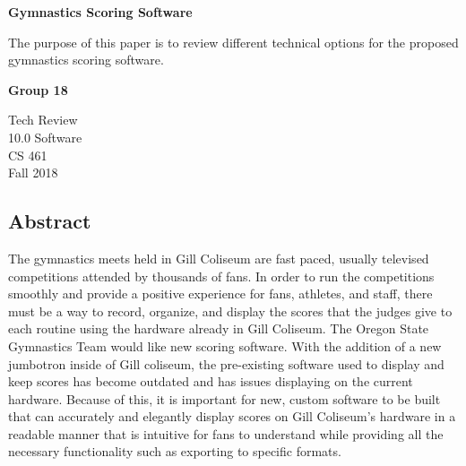 \documentclass[a4paper, 10pt, draftclsnofoot, onecolumn]{article}
\begin{document}
\begin{titlepage}
    \begin{center}
        \vspace*{1cm}
        
        \textbf{Gymnastics Scoring Software}
        
        \vspace{0.5cm}
        The purpose of this paper is to review different technical options for the proposed gymnastics scoring software.
        
        \vspace{1.5cm}
        
        \textbf{Group 18}
        
        Tech Review\\
        10.0 Software\\
        CS 461\\
        Fall 2018\\
        
    \end{center}
    
    \begin{center}
    \section*{Abstract}
    The gymnastics meets held in Gill Coliseum are fast paced, usually televised competitions attended by thousands of fans. In order to run the competitions smoothly and provide a positive experience for fans, athletes, and staff, there must be a way to record, organize, and display the scores that the judges give to each routine using the hardware already in Gill Coliseum. The Oregon State Gymnastics Team would like new scoring software. With the addition of a new jumbotron inside of Gill coliseum, the pre-existing software used to display and keep scores has become outdated and has issues displaying on the current hardware. Because of this, it is important for new, custom software to be built that can accurately and elegantly display scores on Gill Coliseum's hardware in a readable manner that is intuitive for fans to understand while providing all the necessary functionality such as exporting to specific formats.\\
    \end{center}
\end{titlepage}
\end{document}
